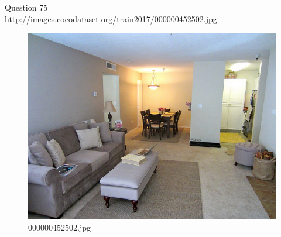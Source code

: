 Question 75\\
http://images.cocodataset.org/train2017/000000452502.jpg
\begin{figure}[h]
    \centering
    \includegraphics[width=0.8\linewidth]{../image set/hard/000000452502.jpg}
    \caption{000000452502.jpg}
\end{figure}
